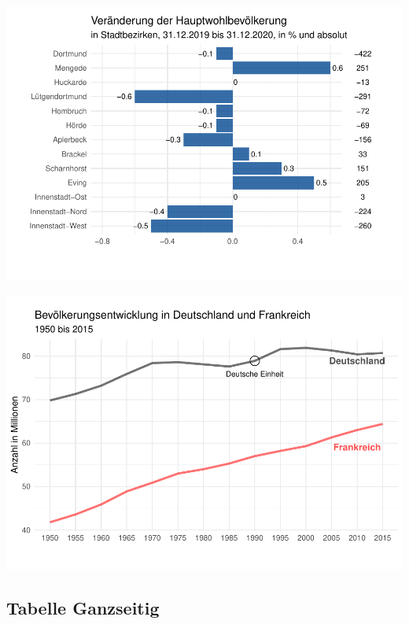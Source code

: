 \documentclass[
  a4paper,
  twoside]{article}
\begin{document}
\includegraphics[width=1\linewidth]{2021-03-02_Beispiel_files/figure-latex/unnamed-chunk-3-1}

\includegraphics[width=1\linewidth]{2021-03-02_Beispiel_files/figure-latex/unnamed-chunk-4-1}

\newpage

\hypertarget{tabelle-ganzseitig}{%
\subsection{Tabelle Ganzseitig}\label{tabelle-ganzseitig}}
\end{document}

